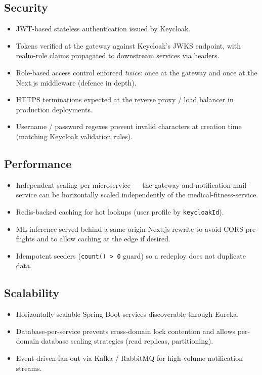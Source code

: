 \documentclass[12pt,a4paper,oneside]{report}
\begin{document}
\subsection*{Security}
\begin{itemize}[leftmargin=*]
  \item JWT-based stateless authentication issued by Keycloak.
  \item Tokens verified at the gateway against Keycloak's JWKS
        endpoint, with realm-role claims propagated to downstream
        services via headers.
  \item Role-based access control enforced \emph{twice}: once at the
        gateway and once at the Next.js middleware (defence in depth).
  \item HTTPS terminations expected at the reverse proxy / load
        balancer in production deployments.
  \item Username / password regexes prevent invalid characters at
        creation time (matching Keycloak validation rules).
\end{itemize}

\subsection*{Performance}
\begin{itemize}[leftmargin=*]
  \item Independent scaling per microservice --- the gateway and
        notification-mail-service can be horizontally scaled
        independently of the medical-fitness-service.
  \item Redis-backed caching for hot lookups (user profile by
        \texttt{keycloakId}).
  \item ML inference served behind a same-origin Next.js rewrite to
        avoid CORS pre-flights and to allow caching at the edge if
        desired.
  \item Idempotent seeders (\texttt{count() > 0} guard) so a redeploy
        does not duplicate data.
\end{itemize}

\subsection*{Scalability}
\begin{itemize}[leftmargin=*]
  \item Horizontally scalable Spring Boot services discoverable
        through Eureka.
  \item Database-per-service prevents cross-domain lock contention
        and allows per-domain database scaling strategies (read
        replicas, partitioning).
  \item Event-driven fan-out via Kafka / RabbitMQ for high-volume
        notification streams.
\end{itemize}
\end{document}
